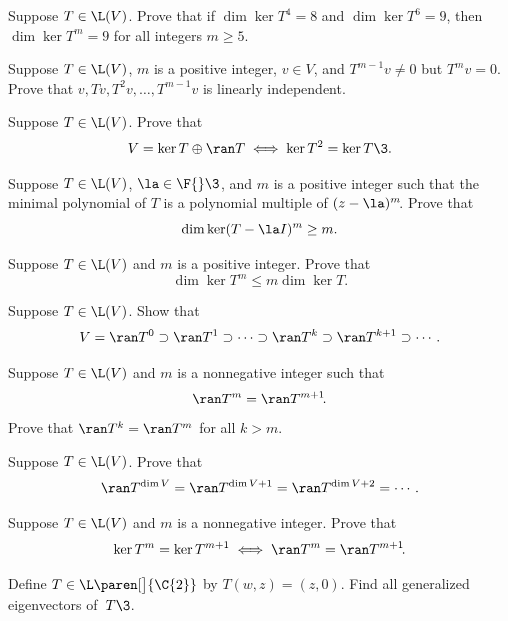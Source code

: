 
\exercise
Suppose $T \in \L(V)$. Prove that if $\dim \ker T^4 = 8$ and $\dim \ker T^6 = 9$, then $\dim \ker T^m = 9$ for all integers $m \ge 5$.


\exercise
Suppose $T \in \L(V)$, $m$ is a positive integer, $v \in V$, and $T^{m-1} v \ne 0$ but $T^m v = 0$. Prove that
$
v, Tv, T^2 v, \dots, T^{m-1} v
$
is linearly independent.\label{8linind}


\exercise
Suppose $T \in \L(V)$. Prove that
\[
V = \ker T \oplus \ran T \iff \ker T^2 = \ker T\3.
\]
\exercisedisplayend


\exercise
Suppose $T \in \L(V)$, $\la \in \F{}\3$, and $m$ is a positive integer such that the minimal polynomial of $T$ is a polynomial multiple of
$(z - \la)^m\!$. Prove that
\[
\dim \ker(T - \la I)^m \ge m.
\]
\exercisedisplayend


\exercise
Suppose $T \in \L(V)$ and $m$ is a positive integer. Prove that
\[
\dim \ker T^m \le m \dim \ker T.
\]
\exercisedisplayend
{}


\exercise
Suppose $T \in \L(V)$. Show that \label{range1}
\[
V = \ran T^0 \supset \ran T^1 \supset \cdots
\supset \ran T^k \supset \ran T^{k+1} \supset \dotsb .
\]
\exercisedisplayend


\exercise
Suppose $T \in \L(V)$ and $m$ is a nonnegative integer such that \label{range2}
\[
\ran T^m = \ran T^{m+1}\!.
\]
Prove that $\ran T^k = \ran T^m$ for all $k > m$.


\exercise
Suppose $T \in \L(V)$. Prove that\label{range3}
\[
\ran T^{\dim V} = \ran T^{\dim V + 1} = \ran T^{\dim V + 2} = \dotsb .
\]
\exercisedisplayend


\exercise
Suppose $T \in \L(V)$ and $m$ is a nonnegative integer. Prove that\label{kerran}
\[
\ker T^m = \ker T^{m+1} \iff \ran T^m = \ran T^{m+1}\!.
\]
\exercisedisplayend

\exercise
Define $T \in \L\paren[\big]{\C{2}}$ by
$
T(w,z) = (z,0)$.
Find all generalized eigenvectors of~$T\3$.


